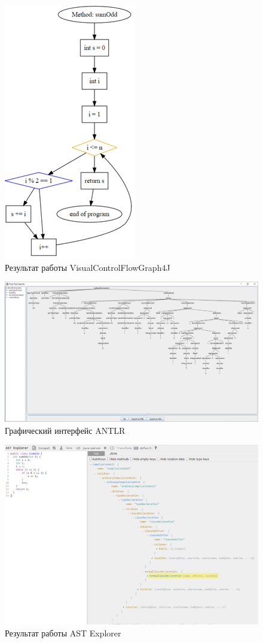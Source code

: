 \begin{figure}[h]
	\center
	\includegraphics [scale=1] {my_folder/images/my/11}
	\caption{Результат работы VisualControlFlowGraph4J}
	\label{fig:11}
\end{figure}
\newpage
\begin{figure}[h]
	\center
	\includegraphics [scale=0.38] {my_folder/images/my/8}
	\caption{Графический интерфейс ANTLR}
	\label{fig:8}
\end{figure}
\begin{figure}[h]
	\center
	\includegraphics [scale=1] {my_folder/images/my/9}
	\caption{Результат работы AST Explorer}
	\label{fig:9}
\end{figure}
